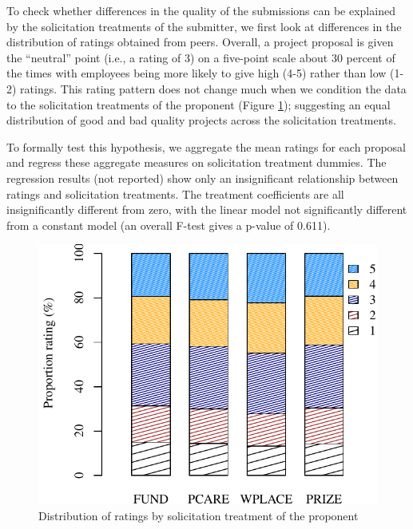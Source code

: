 \documentclass[12pt, titlepage]{article}
\begin{document}
To check whether differences in the quality of the submissions can be
explained by the solicitation treatments of the submitter, we first look
at differences in the distribution of ratings obtained from peers.
Overall, a project proposal is given the ``neutral'' point (i.e., a
rating of 3) on a five-point scale about 30 percent of the times with
employees being more likely to give high (4-5) rather than low (1-2)
ratings. This rating pattern does not change much when we condition the
data to the solicitation treatments of the proponent (Figure
\ref{ratings}); suggesting an equal distribution of good and bad quality
projects across the solicitation treatments.

To formally test this hypothesis, we aggregate the mean ratings for each
proposal and regress these aggregate measures on solicitation treatment
dummies. The regression results (not reported) show only an
insignificant relationship between ratings and solicitation treatments.
The treatment coefficients are all insignificantly different from zero,
with the linear model not significantly different from a constant model
(an overall F-test gives a p-value of 0.611).

\begin{figure}
  \centering
  \caption{Distribution of ratings by solicitation treatment of the proponent}
  \label{ratings}
  \includegraphics{figures/figure_ratings-1.pdf}
\end{figure}
\end{document}

